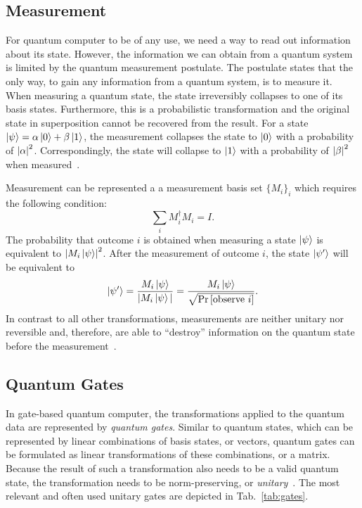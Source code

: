 \subsection{Measurement}
\label{sec:background_measurement}
For quantum computer to be of any use, we need a way to read out information about its state. However, the information we can obtain from a quantum system is limited by the quantum measurement postulate. The postulate states that the only way, to gain any information from a quantum system, is to measure it. When measuring a quantum state, the state irreversibly collapses to one of its basis states.
Furthermore, this is a probabilistic transformation and the original state in superposition cannot be recovered from the result. 
For a state $\ket{\psi} = \alpha \ket{0} + \beta \ket{1}$, the measurement collapses the state to $\ket{0}$ with a probability of $\abs{\alpha}^2$. Correspondingly, the state will collapse to $\ket{1}$ with a probability of $\abs{\beta}^2$ when measured~\cite{DiCh20}.

Measurement can be represented a a measurement basis set $\{M_i\}_i$ which requires the following condition:
\begin{equation*}
    \sum_i M_i^\dagger M_i = I.
\end{equation*}
The probability that outcome $i$ is obtained when measuring a state $\ket{\psi}$ is equivalent to $\abs{M_i \ket{\psi}}^2$. After the measurement of outcome $i$, the state $\ket{\psi'}$ will be equivalent to
\begin{equation*}
    \ket{\psi'} = \frac{M_i \ket{\psi}}{|M_i \ket{\psi}|} = \frac{M_i \ket{\psi}}{\sqrt{\Probability{[\text{observe }i]}}}.
\end{equation*} 
In contrast to all other transformations, measurements are neither unitary nor reversible and, therefore, are able to ``destroy'' information on the quantum state before the measurement~\cite{DiCh20}.

\subsection{Quantum Gates}
\label{sec:background_quantumGates}
In gate-based quantum computer, the transformations applied to the quantum data are represented by \emph{quantum gates}. Similar to quantum states, which can be represented by linear combinations of basis states, or vectors, quantum gates can be formulated as linear transformations of these combinations, or a matrix. Because the result of such a transformation also needs to be a valid quantum state, the transformation needs to be norm-preserving, or \emph{unitary}~\cite{DiCh20}. The most relevant and often used unitary gates are depicted in Tab.~\ref{tab:gates}.

